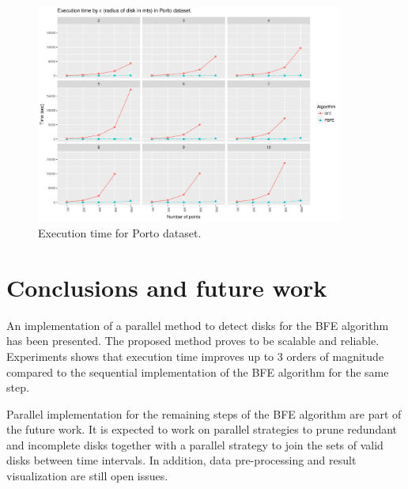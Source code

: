 \documentclass[12pt]{scrartcl}
\begin{document}
\begin{figure}
 \centering
 \includegraphics[width=0.9\textwidth]{figures/porto} 
 \caption{Execution time for Porto dataset.}
 \label{fig:porto}
\end{figure}

\section{Conclusions and future work}\label{sec:conclusions}
An implementation of a parallel method to detect disks for the BFE algorithm has been presented.  The proposed method proves to be scalable and reliable. Experiments shows that execution time improves up to 3 orders of magnitude compared to the sequential implementation of the BFE algorithm for the same step.

Parallel implementation for the remaining steps of the BFE algorithm are part of the future work. It is expected to work on parallel strategies to prune redundant and incomplete disks together with a parallel strategy to join the sets of valid disks between time intervals.  In addition, data pre-processing and result visualization are still open issues.



\end{document}
